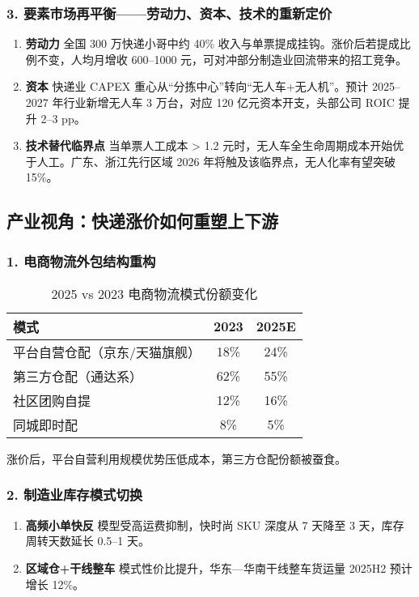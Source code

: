 \subsubsection{3. 要素市场再平衡——劳动力、资本、技术的重新定价}
\begin{enumerate}[leftmargin=*,nosep]
    \item \textbf{劳动力}  
    全国 300 万快递小哥中约 40\% 收入与单票提成挂钩。涨价后若提成比例不变，人均月增收 600–1000 元，可对冲部分制造业回流带来的招工竞争。
    
    \item \textbf{资本}  
    快递业 CAPEX 重心从“分拣中心”转向“无人车+无人机”。预计 2025–2027 年行业新增无人车 3 万台，对应 120 亿元资本开支，头部公司 ROIC 提升 2–3 pp。
    
    \item \textbf{技术替代临界点}  
    当单票人工成本 > 1.2 元时，无人车全生命周期成本开始优于人工。广东、浙江先行区域 2026 年将触及该临界点，无人化率有望突破 15\%。
\end{enumerate}

\subsection{产业视角：快递涨价如何重塑上下游}
\subsubsection{1. 电商物流外包结构重构}
\begin{table}[h]
\centering
\caption{2025 vs 2023 电商物流模式份额变化}
\begin{tabular}{lcc}
\toprule
模式 & 2023 & 2025E \\
\midrule
平台自营仓配（京东/天猫旗舰） & 18\% & 24\% \\
第三方仓配（通达系） & 62\% & 55\% \\
社区团购自提 & 12\% & 16\% \\
同城即时配 & 8\% & 5\% \\
\bottomrule
\end{tabular}
\end{table}
涨价后，平台自营利用规模优势压低成本，第三方仓配份额被蚕食。

\subsubsection{2. 制造业库存模式切换}
\begin{enumerate}[leftmargin=*,nosep]
    \item \textbf{高频小单快反} 模型受高运费抑制，快时尚 SKU 深度从 7 天降至 3 天，库存周转天数延长 0.5–1 天。
    \item \textbf{区域仓+干线整车} 模式性价比提升，华东—华南干线整车货运量 2025H2 预计增长 12\%。
\end{enumerate}

